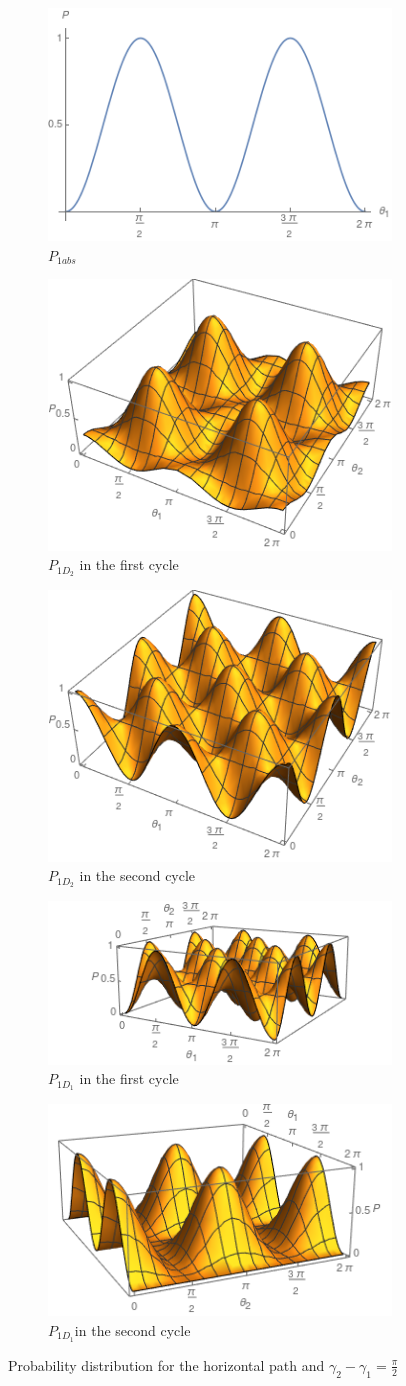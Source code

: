 \documentclass{book}
\begin{document}
\begin{figure}[h!]
\centering
\begin{subfigure}[b]{0.35\linewidth}
\includegraphics[width=\linewidth,height=3 cm]{images/Pc1Abs.png}
\caption{$P_{1abs}$}
\label{fig:BS1}
\end{subfigure}
\begin{subfigure}[b]{0.35\linewidth}
\includegraphics[width=\linewidth,height=3 cm]{images/Pc1D21.png}
\caption{$P_{1D_{2}}$ in the first cycle }
\label{fig:BS1}
\end{subfigure}
\begin{subfigure}[b]{0.35\linewidth}
\includegraphics[width=\linewidth,height=3 cm]{images/Pc1D22.png}
\caption{$P_{1D_{2}}$ in the second cycle}
\label{fig:BS1}
\end{subfigure}
\begin{subfigure}[b]{0.35\linewidth}
\includegraphics[width=\linewidth,height=3 cm]{images/Pc1D11.png}
\caption{$P_{1D_{1}} $ in the first cycle}
\label{fig:westminster_aerea}
\end{subfigure}
\begin{subfigure}[b]{0.35\linewidth}
\includegraphics[width=\linewidth,height=3 cm]{images/Pc1D12.png}
\caption{$P_{1D_{1}} $in the second cycle }
\label{fig:BS1}
\end{subfigure}
\caption{Probability distribution for the horizontal path and  $\gamma_{2}-\gamma_{1}=\frac{\pi}{2}$}
\label{P2chopper}
\end{figure}
\end{document}
